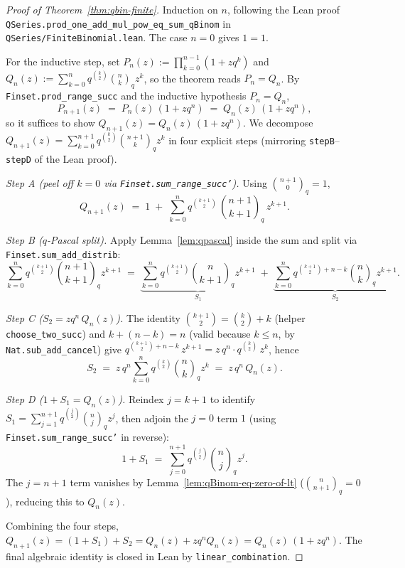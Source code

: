 \begin{proof}[Proof of Theorem~\ref{thm:qbin-finite}]\leanok{}
Induction on $n$, following the Lean proof
\texttt{QSeries.prod\_one\_add\_mul\_pow\_eq\_sum\_qBinom} in
\texttt{QSeries/FiniteBinomial.lean}.
The case $n = 0$ gives $1 = 1$.

For the inductive step, set
$P_n(z) := \prod_{k=0}^{n-1}(1 + z q^k)$ and
$Q_n(z) := \sum_{k=0}^{n} q^{\binom{k}{2}}\binom{n}{k}_q z^k$,
so the theorem reads $P_n = Q_n$. By \texttt{Finset.prod\_range\_succ}
and the inductive hypothesis $P_n = Q_n$,
\[
  P_{n+1}(z) \;=\; P_n(z)\,(1 + z q^n) \;=\; Q_n(z)\,(1 + z q^n),
\]
so it suffices to show $Q_{n+1}(z) = Q_n(z)\,(1 + z q^n)$. We decompose
$Q_{n+1}(z) = \sum_{k=0}^{n+1} q^{\binom{k}{2}}\binom{n+1}{k}_q z^k$ in
four explicit steps (mirroring \texttt{stepB}--\texttt{stepD} of the
Lean proof).

\emph{Step A (peel off $k = 0$ via \texttt{Finset.sum\_range\_succ'}).}
Using $\binom{n+1}{0}_q = 1$,
\[
  Q_{n+1}(z) \;=\; 1 \;+\; \sum_{k=0}^{n} q^{\binom{k+1}{2}}\,\binom{n+1}{k+1}_q\,z^{k+1}.
\]

\emph{Step B ($q$-Pascal split).} Apply Lemma~\ref{lem:qpascal}
inside the sum and split via \texttt{Finset.sum\_add\_distrib}:
\[
  \sum_{k=0}^{n} q^{\binom{k+1}{2}}\binom{n+1}{k+1}_q z^{k+1}
    \;=\; \underbrace{\sum_{k=0}^{n} q^{\binom{k+1}{2}}\binom{n}{k+1}_q z^{k+1}}_{S_1}
       \;+\; \underbrace{\sum_{k=0}^{n} q^{\binom{k+1}{2}+n-k}\binom{n}{k}_q z^{k+1}}_{S_2}.
\]

\emph{Step C ($S_2 = z q^n\, Q_n(z)$).} The identity
$\binom{k+1}{2} = \binom{k}{2} + k$ (helper
\texttt{choose\_two\_succ}) and $k + (n - k) = n$ (valid because
$k \leq n$, by \texttt{Nat.sub\_add\_cancel}) give
$q^{\binom{k+1}{2}+n-k}\, z^{k+1} = z\, q^n \cdot q^{\binom{k}{2}}\, z^k$, hence
\[
  S_2 \;=\; z\, q^n \sum_{k=0}^{n} q^{\binom{k}{2}}\binom{n}{k}_q z^k \;=\; z\, q^n\, Q_n(z).
\]

\emph{Step D ($1 + S_1 = Q_n(z)$).} Reindex $j = k+1$ to identify
$S_1 = \sum_{j=1}^{n+1} q^{\binom{j}{2}}\binom{n}{j}_q z^j$, then
adjoin the $j = 0$ term $1$ (using \texttt{Finset.sum\_range\_succ'}
in reverse):
\[
  1 + S_1 \;=\; \sum_{j=0}^{n+1} q^{\binom{j}{2}}\binom{n}{j}_q z^j.
\]
The $j = n+1$ term vanishes by Lemma~\ref{lem:qBinom-eq-zero-of-lt}
($\binom{n}{n+1}_q = 0$), reducing this to $Q_n(z)$.

Combining the four steps,
$Q_{n+1}(z) = (1 + S_1) + S_2 = Q_n(z) + z q^n Q_n(z) = Q_n(z)\,(1 + z q^n)$.
The final algebraic identity is closed in Lean by
\texttt{linear\_combination}. \qedhere
\end{proof}


